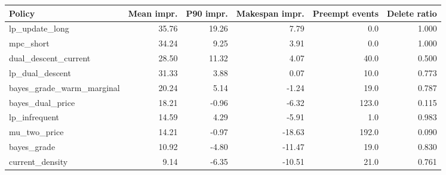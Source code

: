 \begin{tabular}{lrrrrr}
\toprule
Policy & Mean impr. & P90 impr. & Makespan impr. & Preempt events & Delete ratio \\
\midrule
lp\_update\_long & 35.76 & 19.26 & 7.79 & 0.0 & 1.000 \\
mpc\_short & 34.24 & 9.25 & 3.91 & 0.0 & 1.000 \\
dual\_descent\_current & 28.50 & 11.32 & 4.07 & 40.0 & 0.500 \\
lp\_dual\_descent & 31.33 & 3.88 & 0.07 & 10.0 & 0.773 \\
bayes\_grade\_warm\_marginal & 20.24 & 5.14 & -1.24 & 19.0 & 0.787 \\
bayes\_dual\_price & 18.21 & -0.96 & -6.32 & 123.0 & 0.115 \\
lp\_infrequent & 14.59 & 4.29 & -5.91 & 1.0 & 0.983 \\
mu\_two\_price & 14.21 & -0.97 & -18.63 & 192.0 & 0.090 \\
bayes\_grade & 10.92 & -4.80 & -11.47 & 19.0 & 0.830 \\
current\_density & 9.14 & -6.35 & -10.51 & 21.0 & 0.761 \\
\bottomrule
\end{tabular}

